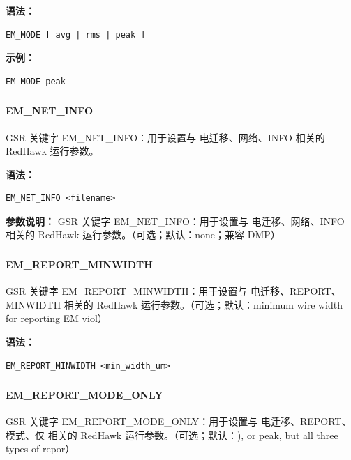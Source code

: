 \textbf{语法：}
\begin{lstlisting}
EM_MODE [ avg | rms | peak ]
\end{lstlisting}

\textbf{示例：}
\begin{lstlisting}
EM_MODE peak
\end{lstlisting}

\subsubsection{}
\paragraph*{EM_NET_INFO}

GSR 关键字 EM_NET_INFO：用于设置与 电迁移、网络、INFO 相关的 RedHawk 运行参数。

\textbf{语法：}
\begin{lstlisting}
EM_NET_INFO <filename>
\end{lstlisting}

\textbf{参数说明：}
GSR 关键字 EM\_NET\_INFO：用于设置与 电迁移、网络、INFO 相关的 RedHawk 运行参数。（可选；默认：none；兼容 DMP）

\subsubsection{}
\paragraph*{EM_REPORT_MINWIDTH}

GSR 关键字 EM_REPORT_MINWIDTH：用于设置与 电迁移、REPORT、MINWIDTH 相关的 RedHawk 运行参数。（可选；默认：minimum wire width for reporting EM viol）

\textbf{语法：}
\begin{lstlisting}
EM_REPORT_MINWIDTH <min_width_um>
\end{lstlisting}

\subsubsection{}
\paragraph*{EM_REPORT_MODE_ONLY}

GSR 关键字 EM_REPORT_MODE_ONLY：用于设置与 电迁移、REPORT、模式、仅 相关的 RedHawk 运行参数。（可选；默认：), or peak, but all three types of repor）

